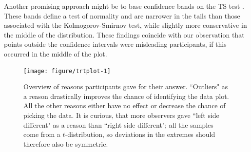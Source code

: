 \documentclass{article}\usepackage[]{graphicx}\usepackage[]{color}
\newenvironment{knitrout}{}{} %
\begin{document}
Another promising approach might be to base confidence bands on the TS test \citep{buja:2013}. These bands define a test of normality and are narrower in the tails than those associated with the Kolmogorov-Smirnov test, while slightly more conservative in the middle of the distribution. These findings coincide with our observation that points  outside the confidence intervals were misleading participants, if this occurred in the middle of the plot.




% 
% 

\begin{figure}[hbt]
\centering
\begin{knitrout}
\color{fgcolor}
\texttt{[image: figure/trtplot-1]} 

\end{knitrout}
\caption{\label{fig:choices}Overview of reasons participants gave for  their answer. ``Outliers" as a reason drastically improves the chance of identifying the data plot. All the other reasons either have no effect or decrease the chance of picking the data. It is curious, that more observers gave ``left side different" as a reason than ``right side different";   all the samples  come from a  $t$-distribution, so deviations in the extremes should therefore also be symmetric.}
\end{figure}
\afterpage{\clearpage}
\end{document}
